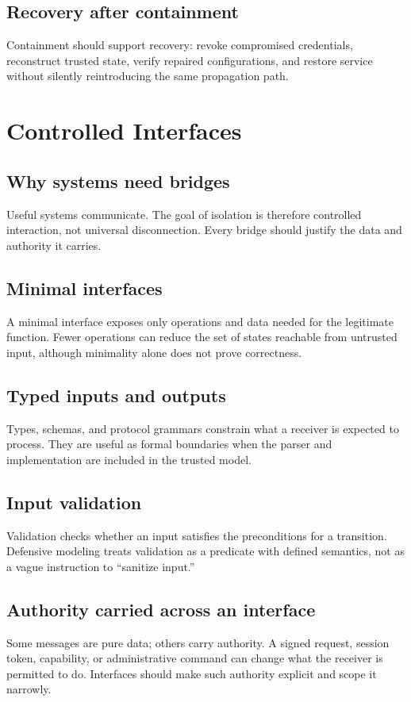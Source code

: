 \documentclass[11pt,oneside]{book}
\theoremstyle{definition}
\theoremstyle{remark}
\begin{document}
\section{Recovery after containment}
Containment should support recovery: revoke compromised credentials, reconstruct trusted state, verify repaired configurations, and restore service without silently reintroducing the same propagation path.

\chapter{Controlled Interfaces}
\label{ch:interfaces}
\section{Why systems need bridges}
Useful systems communicate. The goal of isolation is therefore controlled interaction, not universal disconnection. Every bridge should justify the data and authority it carries.

\section{Minimal interfaces}
A minimal interface exposes only operations and data needed for the legitimate function. Fewer operations can reduce the set of states reachable from untrusted input, although minimality alone does not prove correctness.

\section{Typed inputs and outputs}
Types, schemas, and protocol grammars constrain what a receiver is expected to process. They are useful as formal boundaries when the parser and implementation are included in the trusted model.

\section{Input validation}
Validation checks whether an input satisfies the preconditions for a transition. Defensive modeling treats validation as a predicate with defined semantics, not as a vague instruction to ``sanitize input.''

\section{Authority carried across an interface}
Some messages are pure data; others carry authority. A signed request, session token, capability, or administrative command can change what the receiver is permitted to do. Interfaces should make such authority explicit and scope it narrowly.
\end{document}
